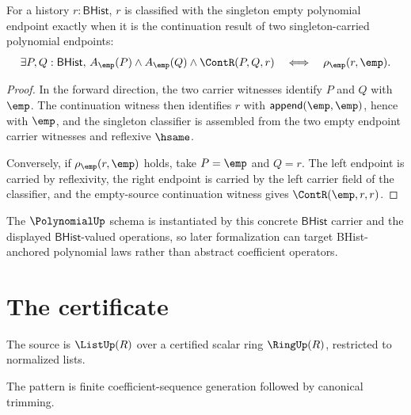 \begin{theorem}
\label{thm:polynomial-singleton-classifier-cont-result-empty-witness-iff}
For a history $r:\mathsf{BHist}$, $r$ is classified with the singleton empty
polynomial endpoint exactly when it is the continuation result of two
singleton-carried polynomial endpoints:
$$
\exists P,Q:\mathsf{BHist},\,
A_{\emp}(P)\wedge A_{\emp}(Q)\wedge \ContR(P,Q,r)
\quad\Longleftrightarrow\quad
\rho_{\emp}(r,\emp).
$$
\end{theorem}
\begin{proof}
In the forward direction, the two carrier witnesses identify $P$ and $Q$ with
$\emp$. The continuation witness then identifies $r$ with
$\mathsf{append}(\emp,\emp)$, hence with $\emp$, and the singleton classifier
is assembled from the two empty endpoint carrier witnesses and reflexive
$\hsame$.

Conversely, if $\rho_{\emp}(r,\emp)$ holds, take $P=\emp$ and $Q=r$. The
left endpoint is carried by reflexivity, the right endpoint is carried by the
left carrier field of the classifier, and the empty-source continuation
witness gives $\ContR(\emp,r,r)$.
\end{proof}

The $\PolynomialUp$ schema is instantiated by this concrete $\mathsf{BHist}$
carrier and the displayed $\mathsf{BHist}$-valued operations, so later
formalization can target BHist-anchored polynomial laws rather than abstract
coefficient operators.

\section{The certificate}

\begin{definition}
\label{def:polynomial-source-specification}
The source is \(\ListUp(R)\) over a certified scalar ring \(\RingUp(R)\), restricted to normalized lists.
\end{definition}

\begin{definition}
\label{def:polynomial-pattern-specification}
The pattern is finite coefficient-sequence generation followed by canonical trimming.
\end{definition}

